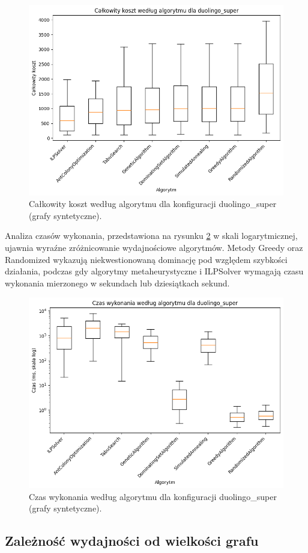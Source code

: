 \begin{figure}[H]
  \centering
  \includegraphics[width=0.7\linewidth]{assets/figures/synthetic_cost_boxplot.png}
  \caption{Całkowity koszt według algorytmu dla konfiguracji duolingo\_super (grafy syntetyczne).}
  \label{fig:synthetic_cost_boxplot}
\end{figure}

Analiza czasów wykonania, przedstawiona na rysunku \ref{fig:synthetic_time_boxplot} w skali logarytmicznej, ujawnia wyraźne zróżnicowanie wydajnościowe algorytmów. Metody Greedy oraz Randomized wykazują niekwestionowaną dominację pod względem szybkości działania, podczas gdy algorytmy metaheurystyczne i ILPSolver wymagają czasu wykonania mierzonego w sekundach lub dziesiątkach sekund.

\begin{figure}[H]
  \centering
  \includegraphics[width=0.7\linewidth]{assets/figures/synthetic_time_boxplot.png}
  \caption{Czas wykonania według algorytmu dla konfiguracji duolingo\_super (grafy syntetyczne).}
  \label{fig:synthetic_time_boxplot}
\end{figure}

\subsection{Zależność wydajności od wielkości grafu}

